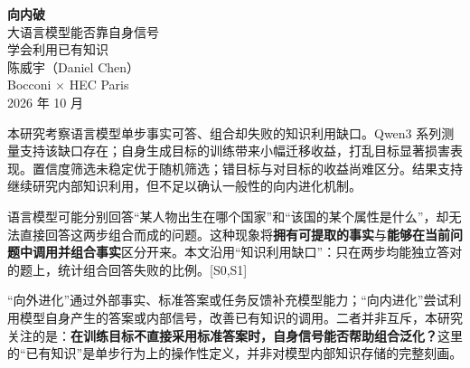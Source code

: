 \documentclass[11pt,a4paper]{article}
\newcommand{\src}[1]{{\scriptsize\color{ink}[#1]}}
\newcommand{\sub}[1]{\par\medskip\noindent{\large\bfseries\color{ink}#1}\par\smallskip}
\begin{document}
\thispagestyle{empty}
\begin{center}
\vspace*{8mm}
{\Huge\bfseries 向内破}\\[5mm]
{\LARGE 大语言模型能否靠自身信号\\[2mm]学会利用已有知识}\\[9mm]
{\large 陈威宇（Daniel Chen）}\\[3mm]
{\large Bocconi $\times$ HEC Paris}\\[4mm]
2026 年 10 月
\end{center}
\vspace{6mm}
\sub{摘要}
本研究考察语言模型单步事实可答、组合却失败的知识利用缺口。Qwen3 系列测量支持该缺口存在；自身生成目标的训练带来小幅迁移收益，打乱目标显著损害表现。置信度筛选未稳定优于随机筛选；错目标与对目标的收益尚难区分。结果支持继续研究内部知识利用，但不足以确认一般性的向内进化机制。
\sub{3\quad 研究问题与动机}
语言模型可能分别回答“某人物出生在哪个国家”和“该国的某个属性是什么”，却无法直接回答这两步组合而成的问题。这种现象将\textbf{拥有可提取的事实}与\textbf{能够在当前问题中调用并组合事实}区分开来。本文沿用“知识利用缺口”：只在两步均能独立答对的题上，统计组合回答失败的比例。\src{S0,S1}

“向外进化”通过外部事实、标准答案或任务反馈补充模型能力；“向内进化”尝试利用模型自身产生的答案或内部信号，改善已有知识的调用。二者并非互斥，本研究关注的是：\textbf{在训练目标不直接采用标准答案时，自身信号能否帮助组合泛化？}这里的“已有知识”是单步行为上的操作性定义，并非对模型内部知识存储的完整刻画。
\end{document}
